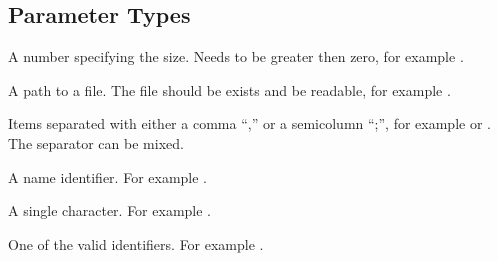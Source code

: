 \subsection{Parameter Types}

\begin{asparadesc}
\item[\typeitem{SIZE}]
A number specifying the size. Needs to be greater then zero, for
example .
\item[\typeitem{FILE}]
A path to a file. The file should be exists and be readable, for example
.
\item[\typeitem{LIST}]
Items separated with either a comma ``,'' or a semicolumn ``;'', for example
 or . The separator can be mixed.
\item[\typeitem{NAME}]
A name identifier. For example .
\item[\typeitem{CHAR}]
A single character. For example \codequoted{,}.
\item[\typeitem{ENUM}]
One of the valid identifiers. For example .
\end{asparadesc}

